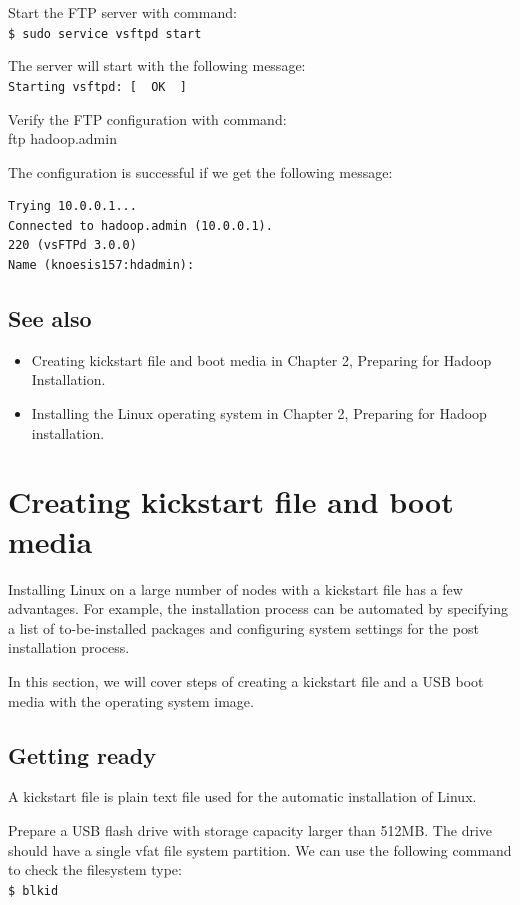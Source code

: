 Start the FTP server with command: \\
\verb|$ sudo service vsftpd start|

The server will start with the following message: \\
\verb|Starting vsftpd: [  OK  ]|

Verify the FTP configuration with command: \\
ftp hadoop.admin

The configuration is successful if we get the following message:
\lstset{style=bashstyle}
\begin{lstlisting}
Trying 10.0.0.1...
Connected to hadoop.admin (10.0.0.1).
220 (vsFTPd 3.0.0)
Name (knoesis157:hdadmin):
\end{lstlisting}

\subsection*{See also}
\begin{itemize}
  \item Creating kickstart file and boot media in Chapter 2, Preparing for Hadoop Installation.
  \item Installing the Linux operating system in Chapter 2, Preparing for Hadoop installation.
\end{itemize}

\section{Creating kickstart file and boot media}
Installing Linux on a large number of nodes with a kickstart file has a few advantages. For example, the installation process can be automated by specifying a list of to-be-installed packages and configuring system settings for the post installation process.

In this section, we will cover steps of creating a kickstart file and a USB boot media with the operating system image.
\subsection*{Getting ready}
A kickstart file is plain text file used for the automatic installation of Linux.

Prepare a USB flash drive with storage capacity larger than 512MB. The drive should have a single vfat file system partition. We can use the following command to check the filesystem type: \\
\verb|$ blkid|

